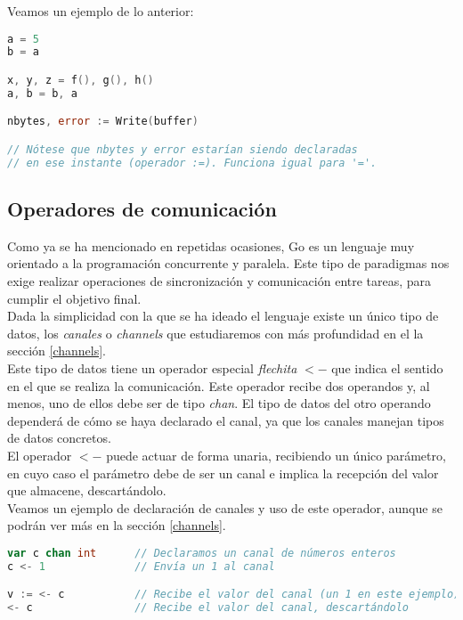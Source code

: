 	Veamos un ejemplo de lo anterior:

\begin{minipage}{17.1cm}
\begin{lstlisting}[language=go,numbers=none,caption=Ejemplo de
asignaciones,label=asig]
a = 5
b = a

x, y, z = f(), g(), h()
a, b = b, a

nbytes, error := Write(buffer)

// Nótese que nbytes y error estarían siendo declaradas
// en ese instante (operador :=). Funciona igual para '='.
\end{lstlisting}
\end{minipage}

	\subsection{Operadores de comunicación}

	Como ya se ha mencionado en repetidas ocasiones, Go es un lenguaje muy
	orientado a la programación concurrente y paralela. Este tipo de paradigmas
	nos exige realizar operaciones de sincronización y comunicación entre
	tareas, para cumplir el objetivo final.\\

	Dada la simplicidad con la que se ha ideado el lenguaje existe un único
	tipo de datos, los \emph{canales} o \emph{channels} que estudiaremos con más
	profundidad en el la sección \ref{channels}.\\

	Este tipo de datos tiene un operador especial \emph{flechita} $<-$ que
	indica el sentido en el que se realiza la comunicación. Este operador recibe
	dos operandos y, al menos, uno de ellos debe ser de tipo \emph{chan}. El
	tipo de datos del otro operando dependerá de cómo se haya declarado el
	canal, ya que los canales manejan tipos de datos concretos.\\

	El operador $<-$ puede actuar de forma unaria, recibiendo un único
	parámetro, en cuyo caso el parámetro debe de ser un canal e implica la
	recepción del valor que almacene, descartándolo.\\

	Veamos un ejemplo de declaración de canales y uso de este operador, aunque se podrán
	ver más en la sección \ref{channels}.\\

\begin{minipage}{17.1cm}
\begin{lstlisting}[language=go,numbers=none,caption=Ejemplo de comunicación
entre canales, label=opflechita]
var c chan int 		// Declaramos un canal de números enteros
c <- 1 				// Envía un 1 al canal

v := <- c 			// Recibe el valor del canal (un 1 en este ejemplo), e inicializa v.
<- c 				// Recibe el valor del canal, descartándolo
\end{lstlisting}
\end{minipage}

